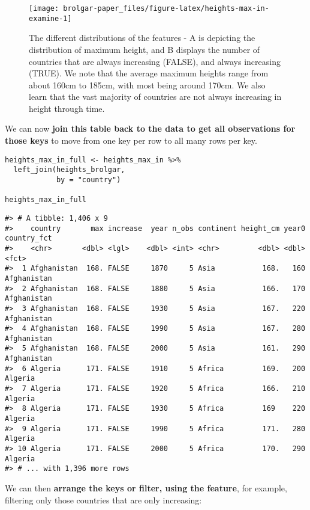 \begin{figure}

{\centering \texttt{[image: brolgar-paper\_files/figure-latex/heights-max-in-examine-1]} 

}

\caption{The different distributions of the features - A is depicting the distribution of maximum height, and B displays the number of countries that are always increasing (FALSE), and always increasing (TRUE). We note that the average maximum heights range from about 160cm to 185cm, with most being around 170cm. We also learn that the vast majority of countries are not always increasing in height through time.}\label{fig:heights-max-in-examine}
\end{figure}

We can now \textbf{join this table back to the data to get all observations for those keys} to move from one key per row to all many rows per key.

\begin{verbatim}
heights_max_in_full <- heights_max_in %>% 
  left_join(heights_brolgar,
            by = "country")

heights_max_in_full
\end{verbatim}

\begin{verbatim}
#> # A tibble: 1,406 x 9
#>    country       max increase  year n_obs continent height_cm year0 country_fct
#>    <chr>       <dbl> <lgl>    <dbl> <int> <chr>         <dbl> <dbl> <fct>      
#>  1 Afghanistan  168. FALSE     1870     5 Asia           168.   160 Afghanistan
#>  2 Afghanistan  168. FALSE     1880     5 Asia           166.   170 Afghanistan
#>  3 Afghanistan  168. FALSE     1930     5 Asia           167.   220 Afghanistan
#>  4 Afghanistan  168. FALSE     1990     5 Asia           167.   280 Afghanistan
#>  5 Afghanistan  168. FALSE     2000     5 Asia           161.   290 Afghanistan
#>  6 Algeria      171. FALSE     1910     5 Africa         169.   200 Algeria    
#>  7 Algeria      171. FALSE     1920     5 Africa         166.   210 Algeria    
#>  8 Algeria      171. FALSE     1930     5 Africa         169    220 Algeria    
#>  9 Algeria      171. FALSE     1990     5 Africa         171.   280 Algeria    
#> 10 Algeria      171. FALSE     2000     5 Africa         170.   290 Algeria    
#> # ... with 1,396 more rows
\end{verbatim}

We can then \textbf{arrange the keys or filter, using the feature}, for example, filtering only those countries that are only increasing:

